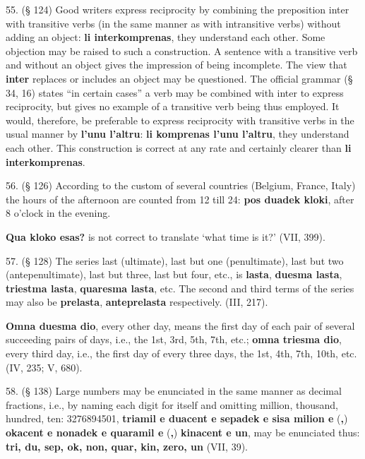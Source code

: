 55. (§ 124) Good writers express reciprocity by combining the preposition inter with transitive verbs (in the same manner as with intransitive verbs) without adding an object: \textbf{li interkomprenas}, they understand each other. Some objection may be raised to such a construction. A sentence with a transitive verb and without an object gives the impression of being incomplete. The view that \textbf{inter} replaces or includes an object may be questioned. The official grammar (§ 34, 16) states ``in certain cases'' a verb may be combined with inter to express reciprocity, but gives no example of a transitive verb being thus employed. It would, therefore, be preferable to express reciprocity with transitive verbs in the usual manner by \textbf{l'unu l'altru}: \textbf{li komprenas l'unu l'altru}, they understand each other. This construction is correct at any rate and certainly clearer than \textbf{li interkomprenas}. %

56. (§ 126) According to the custom of several countries (Belgium, France, Italy) the hours of the afternoon are counted from 12 till 24: \textbf{pos duadek kloki}, after 8 o'clock in the evening. %

\textbf{Qua kloko esas?} is not correct to translate `what time is it?' (VII, 399).

57. (§ 128) The series last (ultimate), last but one (penultimate), last but two (antepenultimate), last but three, last but four, etc., is \textbf{lasta}, \textbf{duesma lasta}, \textbf{triestma lasta}, \textbf{quaresma lasta}, etc. The second and third terms of the series may also be \textbf{prelasta}, \textbf{anteprelasta} respectively. (III, 217). %

\textbf{Omna duesma dio}, every other day, means the first day of each pair of several succeeding pairs of days, i.e., the 1st, 3rd, 5th, 7th, etc.; \textbf{omna triesma dio}, every third day, i.e., the first day of every three days, the 1st, 4th, 7th, 10th, etc. (IV, 235; V, 680).

58. (§ 138) Large numbers may be enunciated in the same manner as decimal fractions, i.e., by naming each digit for itself and omitting million, thousand, hundred, ten: 3276894501, \textbf{triamil e duacent e sepadek e sisa milion e }(\textbf{,})\textbf{ okacent e nonadek e quaramil e }(\textbf{,})\textbf{ kinacent e un}, may be enunciated thus: \textbf{tri, du, sep, ok, non, quar, kin, zero, un} (VII, 39). %

